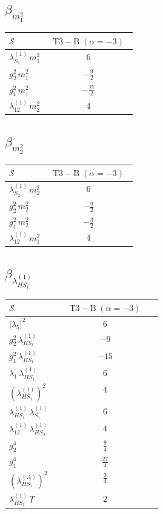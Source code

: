 \documentclass[9pt]{article}
\begin{document}
\subsection*{$ \beta_{m_1^{2}} $}
\begin{longtable}{@{}p{0.31\linewidth}c@{}}
\toprule
$\mathcal{S}$ & $ \mathrm{T3-B}\;(\alpha=-3) $ \\
\midrule
$ \lambda_{S_1}^{(1)}\,m_1^{2} $ & $ 6 $ \\
$ g_2^2\,m_1^{2} $ & $ - \frac{9}{2} $ \\
$ g_1^2\,m_1^{2} $ & $ - \frac{27}{2} $ \\
$ \lambda_{12}^{(1)}\,m_2^{2} $ & $ 4 $ \\
\bottomrule
\end{longtable}
\subsection*{$ \beta_{m_2^{2}} $}
\begin{longtable}{@{}p{0.31\linewidth}c@{}}
\toprule
$\mathcal{S}$ & $ \mathrm{T3-B}\;(\alpha=-3) $ \\
\midrule
$ \lambda_{S_2}^{(1)}\,m_2^{2} $ & $ 6 $ \\
$ g_2^2\,m_2^{2} $ & $ - \frac{9}{2} $ \\
$ g_1^2\,m_2^{2} $ & $ - \frac{3}{2} $ \\
$ \lambda_{12}^{(1)}\,m_1^{2} $ & $ 4 $ \\
\bottomrule
\end{longtable}
\subsection*{$ \beta_{\lambda_{HS_1}^{(1)}} $}
\begin{longtable}{@{}p{0.31\linewidth}c@{}}
\toprule
$\mathcal{S}$ & $ \mathrm{T3-B}\;(\alpha=-3) $ \\
\midrule
$ |\lambda_5|^2 $ & $ 6 $ \\
$ g_2^2\,\lambda_{HS_1}^{(1)} $ & $ -9 $ \\
$ g_1^2\,\lambda_{HS_1}^{(1)} $ & $ -15 $ \\
$ \lambda_1\,\lambda_{HS_1}^{(1)} $ & $ 6 $ \\
$ \left(\lambda_{HS_1}^{(1)}\right)^2 $ & $ 4 $ \\
$ \lambda_{HS_1}^{(1)}\,\lambda_{S_1}^{(1)} $ & $ 6 $ \\
$ \lambda_{12}^{(1)}\,\lambda_{HS_2}^{(1)} $ & $ 4 $ \\
$ g_2^4 $ & $ \frac{9}{4} $ \\
$ g_1^4 $ & $ \frac{27}{4} $ \\
$ \left(\lambda_{HS_1}^{(A)}\right)^2 $ & $ \frac{3}{4} $ \\
$ \lambda_{HS_1}^{(1)}\,T $ & $ 2 $ \\
\bottomrule
\end{longtable}
\end{document}
